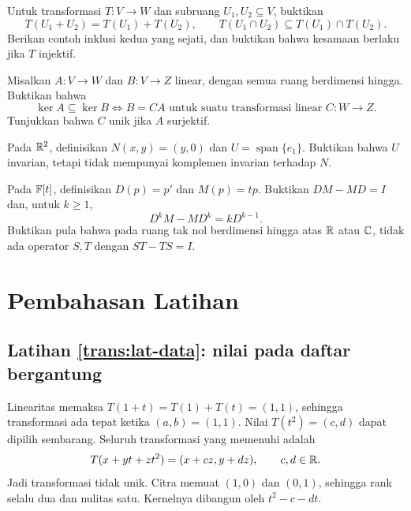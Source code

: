 \begin{latihan}\label{trans:lat-irisan}
    Untuk transformasi $T:V\to W$ dan subruang $U_1,U_2\subseteq V$,
    buktikan
    \[
        T(U_1+U_2)=T(U_1)+T(U_2),\qquad
        T(U_1\cap U_2)\subseteq T(U_1)\cap T(U_2).
    \]
    Berikan contoh inklusi kedua yang sejati, dan buktikan bahwa
    kesamaan berlaku jika $T$ injektif.
\end{latihan}

\begin{latihan}\label{trans:lat-faktorisasi}
    Misalkan $A:V\to W$ dan $B:V\to Z$ linear, dengan semua
    ruang berdimensi hingga. Buktikan bahwa
    \[
        \ker A\subseteq\ker B
        \iff B=CA\text{ untuk suatu transformasi linear }C:W\to Z.
    \]
    Tunjukkan bahwa $C$ unik jika $A$ surjektif.
\end{latihan}

\begin{latihan}\label{trans:lat-komplemen-invarian}
    Pada $\mathbb{R}^2$, definisikan $N(x,y)=(y,0)$ dan
    $U=\operatorname{span}\{e_1\}$.
    Buktikan bahwa $U$ invarian, tetapi tidak mempunyai
    komplemen invarian terhadap $N$.
\end{latihan}

\begin{latihan}\label{trans:lat-komutator-identitas}
    Pada $\mathbb{F}[t]$, definisikan $D(p)=p'$ dan $M(p)=tp$.
    Buktikan $DM-MD=I$ dan, untuk $k\ge1$,
    \[
        D^kM-MD^k=kD^{k-1}.
    \]
    Buktikan pula bahwa pada ruang tak nol berdimensi hingga
    atas $\mathbb{R}$ atau $\mathbb{C}$, tidak ada operator $S,T$ dengan $ST-TS=I$.
\end{latihan}

\ifpembahasan
\section{Pembahasan Latihan}

\subsection*{Latihan \ref{trans:lat-data}: nilai pada daftar bergantung}
Linearitas memaksa $T(1+t)=T(1)+T(t)=(1,1)$,
sehingga transformasi ada tepat ketika $(a,b)=(1,1)$.
Nilai $T(t^2)=(c,d)$ dapat dipilih sembarang.
Seluruh transformasi yang memenuhi adalah
\[
    T(x+yt+zt^2)=(x+cz,y+dz),\qquad c,d\in\mathbb{R}.
\]
Jadi transformasi tidak unik. Citra memuat $(1,0)$ dan $(0,1)$,
sehingga rank selalu dua dan nulitas satu.
Kernelnya dibangun oleh $t^2-c-dt$.

